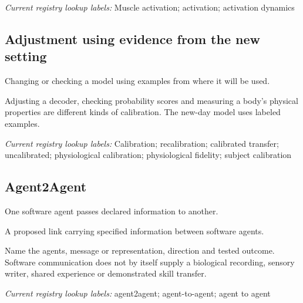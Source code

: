 \noindent\textit{Current registry lookup labels:} Muscle activation; activation; activation dynamics\par

\begin{samepage}
\subsection*{Adjustment using evidence from the new setting}
\noindent Changing or checking a model using examples from where it will be used.\par
\end{samepage}
\begin{samepage}
\noindent Adjusting a decoder, checking probability scores and measuring a body’s physical properties are different kinds of calibration. The new-day model uses labeled examples.\par\nopagebreak[4]

\end{samepage}


\noindent\textit{Current registry lookup labels:} Calibration; recalibration; calibrated transfer; uncalibrated; physiological calibration; physiological fidelity; subject calibration\par

\begin{samepage}
\subsection*{Agent2Agent}
\noindent One software agent passes declared information to another.\par
\end{samepage}
\noindent A proposed link carrying specified information between software agents.\par
\begin{samepage}
\noindent Name the agents, message or representation, direction and tested outcome. Software communication does not by itself supply a biological recording, sensory writer, shared experience or demonstrated skill transfer.\par\nopagebreak[4]

\end{samepage}


\noindent\textit{Current registry lookup labels:} agent2agent; agent-to-agent; agent to agent\par

